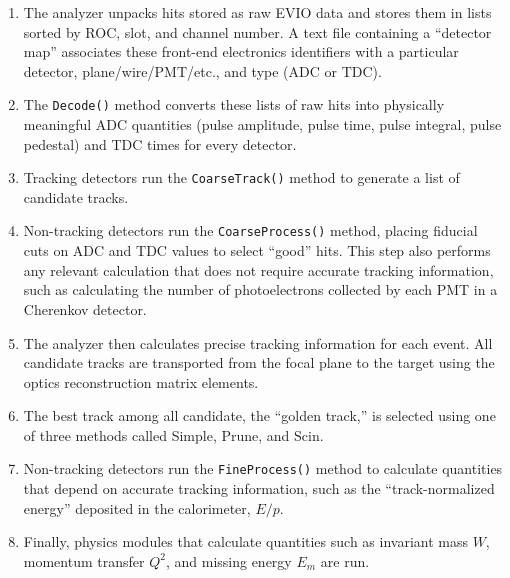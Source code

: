 \begin{enumerate}

    \item The analyzer unpacks hits stored as raw EVIO data and stores them in
        lists sorted by ROC, slot, and channel number.
        A text file containing a ``detector map'' associates these front-end
        electronics identifiers with a particular detector,
        plane/wire/PMT/etc., and type (ADC or TDC).

    \item The \texttt{Decode()} method converts these lists of raw hits into
        physically meaningful ADC quantities (pulse amplitude, pulse time,
        pulse integral, pulse pedestal) and TDC times for every detector.

    \item Tracking detectors run the \texttt{CoarseTrack()} method to generate
        a list of candidate tracks.

    \item Non-tracking detectors run the \texttt{CoarseProcess()} method,
        placing fiducial cuts on ADC and TDC values to select ``good'' hits.
        This step also performs any relevant calculation that does not require
        accurate tracking information, such as calculating the number of
        photoelectrons collected by each PMT in a Cherenkov detector.

    \item The analyzer then calculates precise tracking information for each
        event.
        All candidate tracks are transported from the focal plane to the target
        using the optics reconstruction matrix elements.

    \item The best track among all candidate, the ``golden track,'' is selected
        using one of three methods called Simple, Prune, and Scin.

    \item Non-tracking detectors run the \texttt{FineProcess()} method to
        calculate quantities that depend on accurate tracking information,
        such as the ``track-normalized energy'' deposited in the calorimeter,
        $E/p$.

    \item Finally, physics modules that calculate quantities such as invariant
        mass $W$, momentum transfer $Q^2$, and missing energy $E_m$ are run.

\end{enumerate}


